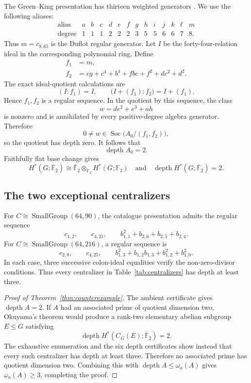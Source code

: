 \documentclass[11pt]{amsart}
\theoremstyle{definition}
\theoremstyle{remark}
\DeclareMathOperator{\depth}{depth}
\DeclareMathOperator{\Soc}{Soc}
\newcommand{\F}{\mathbb F}
\newcommand{\kbar}{\overline{\mathbb F}_{2}}
\newcommand{\SG}[2]{\operatorname{SmallGroup}(#1,#2)}
\begin{document}
The Green--King presentation has thirteen weighted generators \cite{GreenKingDatabase}.  We use the following aliases:
\[
\begin{array}{c|ccccccccccccc}
\text{alias}&a&b&c&d&e&f&g&h&i&j&k&\ell&m\\
\hline
\text{degree}&1&1&1&2&2&2&3&5&5&6&6&7&8.
\end{array}
\]
Thus \(m=c_{8,65}\) is the Duflot regular generator.  Let \(I\) be the forty-four-relation ideal in the corresponding polynomial ring.  Define
\begin{align}
 f_1&=m,\label{eq:f1}\\
 f_2&=cg+c^4+b^4+fbc+f^2+dc^2+d^2.\label{eq:f2}
\end{align}
The exact ideal-quotient calculations are
\begin{equation}
\label{eq:colon-cert}
(I:f_1)=I,
\qquad
\bigl(I+(f_1):f_2\bigr)=I+(f_1).
\end{equation}
Hence \(f_1,f_2\) is a regular sequence.  In the quotient by this sequence, the class
\begin{equation}
\label{eq:socle-witness}
w=de^2+e^3+ah
\end{equation}
is nonzero and is annihilated by every positive-degree algebra generator.  Therefore
\[
0\neq w\in \Soc\bigl(A_0/(f_1,f_2)\bigr),
\]
so the quotient has depth zero.  It follows that
\[
\depth A_0=2.
\]
Faithfully flat base change gives
\[
H^*(G;\kbar)\cong\kbar\otimes_{\F_2}H^*(G;\F_2)
\quad\text{and}\quad
\depth H^*(G;\kbar)=2.
\]

\subsection{The two exceptional centralizers}

For \(C\cong\SG{64}{90}\), the catalogue presentation admits the regular sequence
\[
c_{1,2},\qquad c_{4,21},\qquad
b_{1,1}^2+b_{2,6}+b_{2,5}+b_{2,4}.
\]
For \(C\cong\SG{64}{216}\), a regular sequence is
\[
c_{2,8},\qquad c_{4,25},\qquad
b_{1,3}^2+b_{1,2}b_{1,3}+b_{1,2}^2+b_{1,0}^2.
\]
In each case, three successive colon-ideal equalities verify the non-zero-divisor conditions.  Thus every centralizer in Table~\ref{tab:centralizers} has depth at least three.

\begin{proof}[Proof of Theorem~\ref{thm:counterexample}]
The ambient certificate gives \(\depth A=2\).  If \(A\) had an associated prime of quotient dimension two, Okuyama's theorem would produce a rank-two elementary abelian subgroup \(E\leq G\) satisfying
\[
\depth H^*(C_G(E);\kbar)=2.
\]
The exhaustive enumeration and the six depth certificates show instead that every such centralizer has depth at least three.  Therefore no associated prime has quotient dimension two.  Combining this with \(\depth A\leq\omega_a(A)\) gives \(\omega_a(A)\geq3\), completing the proof.
\end{proof}
\end{document}

